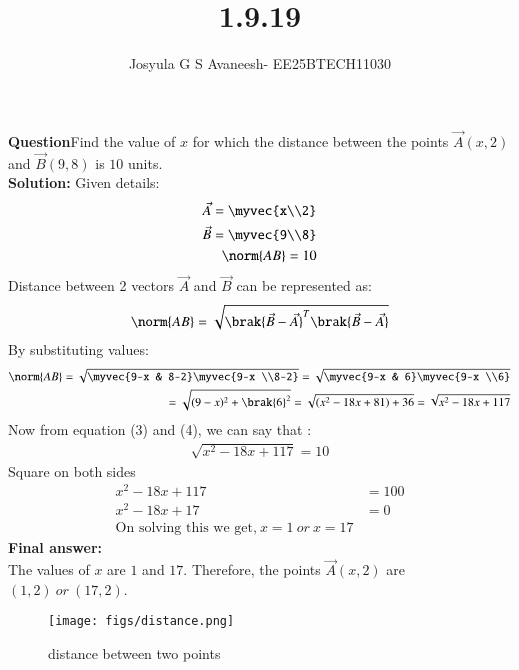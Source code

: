 \documentclass[journal]{IEEEtran}
\theoremstyle{remark}
\begin{document}

\onecolumn

\title{1.9.19}
\author{Josyula G S Avaneesh- EE25BTECH11030}
\maketitle


\renewcommand{\thefigure}{\theenumi}
\renewcommand{\thetable}{\theenumi}
\textbf{Question}Find the value of $x$ for which the distance between the points $\vec{A}(x,2)$ and $\vec{B}(9,8)$ is $10$ units.\\
\textbf{Solution: }Given details:
\begin{align}
    \vec{A}=\myvec{x\\2}\\  \vec{B}=\myvec{9\\8}\\ \norm{AB}=10 
\end{align}
Distance between 2 vectors $\vec{A}$ and $\vec{B}$ can be represented as:
\begin{align}
    \norm{AB}=\sqrt{\brak{\vec{B}-\vec{A}}^T\brak{\vec{B}-\vec{A}}}
\end{align}
By substituting values:
\begin{align}
    \norm{AB}=\sqrt{\myvec{9-x & 8-2}\myvec{9-x \\8-2}}=\sqrt{\myvec{9-x & 6}\myvec{9-x \\6}}\\
    =\sqrt{(9-x)^2+ \brak{6}^2} =\sqrt{(x^2-18x+81)+36}=\sqrt{x^2-18x+117}
\end{align}
Now from equation (3) and (4), we can say that :
\begin{align}
    \sqrt{x^2-18x+117}=10
\end{align}
Square on both sides
\begin{align}
    x^2 -18x+117&=100\\
    x^2-18x+17&=0\\
    \text{On solving this we get,}\
    x=1\  or\ x=17
\end{align}
\textbf{Final answer:}\\
The values of $x$ are $1$ and $17$.
Therefore, the points $\vec{A}(x,2)$ are $(1,2) \ or \ (17,2)$.
\begin{figure}[H]
    \centering
    \texttt{[image: figs/distance.png]}
    \caption{distance between two points}
    \label{fig:placeholder_1}
\end{figure}
\end{document}
